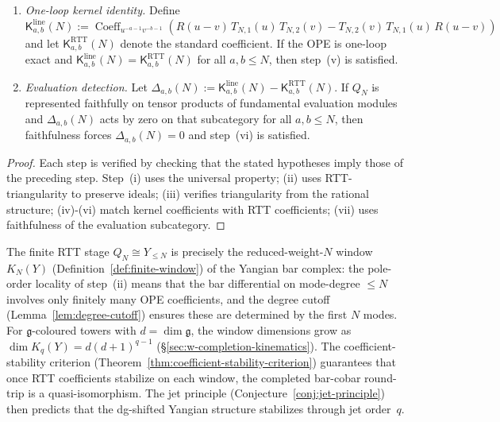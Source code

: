 \begin{proposition}
\begin{enumerate}[label=\textup{(\roman*)}]
\item \emph{One-loop kernel identity.}
 Define
 $\mathsf{K}^{\mathrm{line}}_{a,b}(N):=
 \operatorname{Coeff}_{u^{-a-1}v^{-b-1}}
 (R(u\!-\!v)\,T_{N,1}(u)\,T_{N,2}(v)
 -T_{N,2}(v)\,T_{N,1}(u)\,R(u\!-\!v))$
 and let $\mathsf{K}^{\mathrm{RTT}}_{a,b}(N)$ denote the standard
 coefficient. If the OPE is one-loop exact and
 $\mathsf{K}^{\mathrm{line}}_{a,b}(N)
 =\mathsf{K}^{\mathrm{RTT}}_{a,b}(N)$ for all $a,b \le N$, then
 step~\textup{(v)} is satisfied.

\item \emph{Evaluation detection.}
 Let $\Delta_{a,b}(N):=
 \mathsf{K}^{\mathrm{line}}_{a,b}(N)
 -\mathsf{K}^{\mathrm{RTT}}_{a,b}(N)$. If $Q_N$ is represented
 faithfully on tensor products of fundamental evaluation modules and
 $\Delta_{a,b}(N)$ acts by zero on that subcategory for all
 $a,b \le N$, then faithfulness forces $\Delta_{a,b}(N)=0$ and
 step~\textup{(vi)} is satisfied.
\end{enumerate}
\end{proposition}

\begin{proof}
Each step is verified by checking that the stated hypotheses imply
those of the preceding step. Step~\textup{(i)} uses the universal
property; \textup{(ii)} uses RTT-triangularity to preserve ideals;
\textup{(iii)} verifies triangularity from the rational structure;
\textup{(iv)}-\textup{(vi)} match kernel coefficients with RTT
coefficients; \textup{(vii)} uses faithfulness of the evaluation
subcategory.
\end{proof}

\begin{remark}
\label{rem:rtt-as-windows}
The finite RTT stage $Q_N \cong Y_{\le N}$ is precisely the
reduced-weight-$N$ window $K_N(Y)$
(Definition~\ref{def:finite-window}) of the Yangian bar complex: the
pole-order locality of step~\textup{(ii)} means that the bar
differential on mode-degree $\le N$ involves only finitely many OPE
coefficients, and the degree cutoff
(Lemma~\ref{lem:degree-cutoff}) ensures these are determined by the
first $N$ modes. For $\mathfrak{g}$-coloured towers with
$d = \dim\mathfrak{g}$, the window dimensions grow as
$\dim K_q(Y) = d(d+1)^{q-1}$
(\S\ref{sec:w-completion-kinematics}). The coefficient-stability
criterion (Theorem~\ref{thm:coefficient-stability-criterion})
guarantees that once RTT coefficients stabilize on each window, the
completed bar-cobar round-trip is a quasi-isomorphism. The jet
principle \ifannalsedition\else
(Conjecture~\ref{conj:jet-principle})
\fi then predicts that
the dg-shifted Yangian structure stabilizes through jet order~$q$.
\end{remark}

